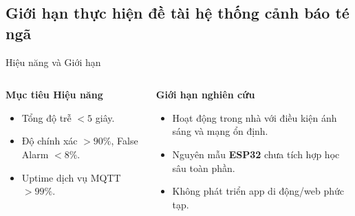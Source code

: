
\subsection{Giới hạn thực hiện đề tài hệ thống cảnh báo té ngã} 
\begin{frame}{Hiệu năng và Giới hạn}
    \begin{columns}[T]
        \begin{column}{0.48\textwidth}
            \textbf{Mục tiêu Hiệu năng}
            \begin{itemize}
                \item Tổng độ trễ $<5$ giây.
                \item Độ chính xác $>90\%$, False Alarm $<8\%$.
                \item Uptime dịch vụ MQTT $>99\%$.
            \end{itemize}
        \end{column}
        \begin{column}{0.48\textwidth}
            \textbf{Giới hạn nghiên cứu}
            \begin{itemize}
                \item Hoạt động trong nhà với điều kiện ánh sáng và mạng ổn định.
                \item Nguyên mẫu \textbf{ESP32} chưa tích hợp học sâu toàn phần.
                \item Không phát triển app di động/web phức tạp.
            \end{itemize}
        \end{column}
    \end{columns}
\end{frame}
